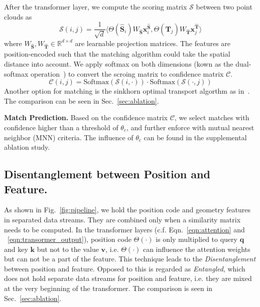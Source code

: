 After the transformer layer, we compute the scoring matrix $\mathcal{S}$ between two point clouds as 
\begin{equation}\label{eqn:matching}
\mathcal{S}(i,j)=\frac{1}{\sqrt{d}} \langle \Theta(\mathbf{\hat{S}}_i) W_{\mathbf{\hat{S}}}\mathbf{x}_i^\mathbf{\hat{S}}, \Theta(\mathbf{\hat{T}}_j) W_{\mathbf{\hat{T}}} \mathbf{x}_j^\mathbf{\hat{T}} \rangle 
\end{equation}
where $W_{\mathbf{\hat{S}}},W_{\mathbf{ \hat{ T}} }\in\mathbb{R}^{d\times d}$ are learnable projection matrices.
The features are position-encoded such that the matching algorithm could take the spatial distance into account.
We apply softmax on both dimensions (kown as the dual-softmax operation~\cite{sun2021loftr,rocco2018neighbourhood}) to convert the scroing matrix to confidence matrix $\mathcal{C}$.
$$
\mathcal{C}(i,j) = \text{Softmax}(\mathcal{S}(i,\cdot))\cdot \text{Softmax}(\mathcal{S}(\cdot,j))    
$$
Another option for matching is the sinkhorn optimal transport algorthm as in~\cite{sarlin2020superglue}. The  comparison can be seen in Sec.~\ref{sec:ablation}.

\medskip
\noindent
\textbf{Match Prediction.}
Based on the confidence matrix $\mathcal{C}$, we select matches with confidence higher than a threshold of $\theta_c$, and further enforce with mutual nearest neighbor (MNN) criteria. The influence of $\theta_c$ can be found in the supplemental ablation study.


\subsection{Disentanglement between Position and Feature.}
As shown in Fig.~\ref{fig:pipeline}, we hold the position code and geometry features in separated data streams. They are combined only when a similarity matrix needs to be computed.  In the transformer layers  (c.f. Eqn.~\ref{eqn:attention} and ~\ref{eqn:transormer_output}), position code $\Theta(\cdot)$ is only multiplied to query $\mathbf{q}$ and key $\mathbf{k}$ but not to the value $\mathbf{v}$, i.e. $\Theta(\cdot) $ can influence the attention weights but can not be a part of the feature.  
This technique leads to the \textit{Disentanglement} between position and feature. 
Opposed to this is regarded as \textit{Entangled}, which does not hold separate data streams for position and feature, i.e. they are mixed at the very beginning of the transformer.
The comparison is seen in Sec.~\ref{sec:ablation}.


